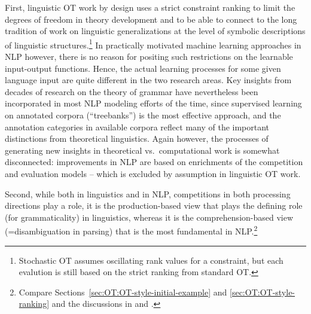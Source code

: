 \documentclass[output=paper,hidelinks]{langscibook}
\begin{document}
First, linguistic OT work by design uses a strict constraint ranking to limit the degrees of freedom in theory development and to be able to connect to the long tradition of work on linguistic generalizations at the level of symbolic descriptions of linguistic structures.\footnote{%
Stochastic OT assumes oscillating rank values for a constraint, but each evalution is still based on the strict ranking from standard OT.} In practically motivated machine learning approaches in NLP however, there is no reason for positing such restrictions on the learnable input-output functions. Hence, the actual learning processes for some given language input are quite different in the two research areas.
Key insights from decades of research on the theory of grammar have nevertheless been incorporated in most NLP modeling efforts of the time, since supervised learning on annotated corpora (``treebanks'') is the most effective approach, and the annotation categories in available corpora
reflect many of the important distinctions from theoretical linguistics. Again however, the processes of generating new insights in theoretical vs.\ computational work is somewhat disconnected: improvements in NLP are based on enrichments of the competition and evaluation models -- which is excluded by assumption in linguistic OT work.

Second, while both in linguistics and in NLP, competitions in both processing directions play a role, it is the production-based view that plays the defining role (for grammaticality) in linguistics, whereas it is the comprehension-based view (=disambiguation in parsing) that is the most fundamental in NLP.\footnote{Compare
Sections~\ref{sec:OT:OT-style-initial-example} and \ref{sec:OT:OT-style-ranking} and the discussions in \citet{franketal01} and \citet{Kuhn-CSLI-vol,Kuhn-CSLI-book}.}
\end{document}
